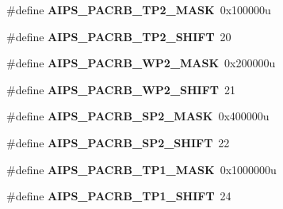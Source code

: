 \begin{DoxyCompactItemize}
\item 
\hypertarget{group___a_i_p_s___register___masks_ga739172b56d496c92a6fcfe1983ba0d8e}{}\#define {\bfseries A\+I\+P\+S\+\_\+\+P\+A\+C\+R\+B\+\_\+\+T\+P2\+\_\+\+M\+A\+S\+K}~0x100000u\label{group___a_i_p_s___register___masks_ga739172b56d496c92a6fcfe1983ba0d8e}

\item 
\hypertarget{group___a_i_p_s___register___masks_gaa95aa4eedb53746b3cc3b185e298649c}{}\#define {\bfseries A\+I\+P\+S\+\_\+\+P\+A\+C\+R\+B\+\_\+\+T\+P2\+\_\+\+S\+H\+I\+F\+T}~20\label{group___a_i_p_s___register___masks_gaa95aa4eedb53746b3cc3b185e298649c}

\item 
\hypertarget{group___a_i_p_s___register___masks_ga4c17554adc28ff0105b7aad16ccde0dd}{}\#define {\bfseries A\+I\+P\+S\+\_\+\+P\+A\+C\+R\+B\+\_\+\+W\+P2\+\_\+\+M\+A\+S\+K}~0x200000u\label{group___a_i_p_s___register___masks_ga4c17554adc28ff0105b7aad16ccde0dd}

\item 
\hypertarget{group___a_i_p_s___register___masks_gad7234229e79e3e2a5366e9d907a51e0b}{}\#define {\bfseries A\+I\+P\+S\+\_\+\+P\+A\+C\+R\+B\+\_\+\+W\+P2\+\_\+\+S\+H\+I\+F\+T}~21\label{group___a_i_p_s___register___masks_gad7234229e79e3e2a5366e9d907a51e0b}

\item 
\hypertarget{group___a_i_p_s___register___masks_gac008650adc25885669aa84cf83ea116e}{}\#define {\bfseries A\+I\+P\+S\+\_\+\+P\+A\+C\+R\+B\+\_\+\+S\+P2\+\_\+\+M\+A\+S\+K}~0x400000u\label{group___a_i_p_s___register___masks_gac008650adc25885669aa84cf83ea116e}

\item 
\hypertarget{group___a_i_p_s___register___masks_gac82b74c3937dae7da06f32aecc605eff}{}\#define {\bfseries A\+I\+P\+S\+\_\+\+P\+A\+C\+R\+B\+\_\+\+S\+P2\+\_\+\+S\+H\+I\+F\+T}~22\label{group___a_i_p_s___register___masks_gac82b74c3937dae7da06f32aecc605eff}

\item 
\hypertarget{group___a_i_p_s___register___masks_gae937628c6d0eb166336c0f432110c118}{}\#define {\bfseries A\+I\+P\+S\+\_\+\+P\+A\+C\+R\+B\+\_\+\+T\+P1\+\_\+\+M\+A\+S\+K}~0x1000000u\label{group___a_i_p_s___register___masks_gae937628c6d0eb166336c0f432110c118}

\item 
\hypertarget{group___a_i_p_s___register___masks_ga48fadbc800728c286a968bdb5468ced8}{}\#define {\bfseries A\+I\+P\+S\+\_\+\+P\+A\+C\+R\+B\+\_\+\+T\+P1\+\_\+\+S\+H\+I\+F\+T}~24\label{group___a_i_p_s___register___masks_ga48fadbc800728c286a968bdb5468ced8}


\end{DoxyCompactItemize}
